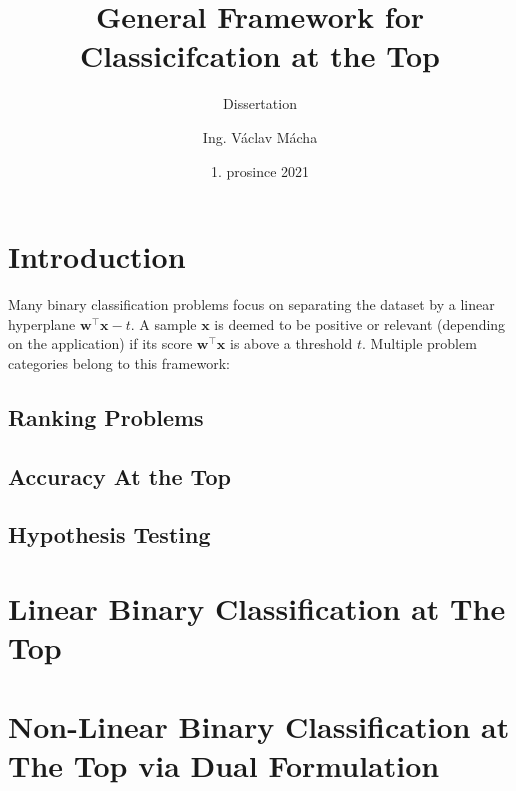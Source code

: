 \documentclass{Thesis}
\title{General Framework for Classicifcation at the Top}
\subtitle{Dissertation}
\author{Ing. Václav Mácha}
\date{1. prosince 2021}
\newcommand{\wb}{\bm{w}}
\newcommand{\xb}{\bm{x}}
\begin{document}
\maketitle
\tableofcontents

\chapter{Introduction}

Many binary classification problems focus on separating the dataset by a linear hyperplane $\wb^\top \xb - t$. A sample $\xb$ is deemed to be positive or relevant (depending on the application) if its score $\wb^\top \xb$ is above a threshold $t$. Multiple problem categories belong to this framework:

\section{Ranking Problems}

\section{Accuracy At the Top}

\section{Hypothesis Testing}

\chapter{Linear Binary Classification at The Top}

\chapter{Non-Linear Binary Classification at The Top via Dual Formulation}
\end{document}
